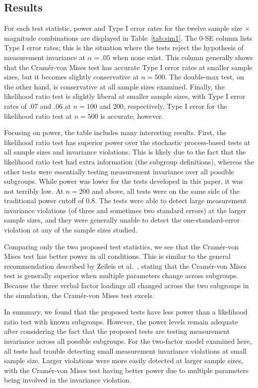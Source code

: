 \documentclass[man]{apa}
\begin{document}
\subsection{Results}
For each test statistic, power and Type I error rates for the twelve
sample size $\times$ magnitude combinations are displayed in
Table~\ref{tab:sim1}.  The 0-SE column lists Type I error rates; this
is the situation where the tests reject the hypothesis of measurement
invariance at $\alpha=.05$ when none exist.  This column generally
shows that the Cram\'{e}r-von Mises test has accurate Type I error
rates at smaller sample sizes, but it becomes slightly conservative at
$n=500$.  The double-max test, on the other hand, is conservative at
all sample sizes examined.  Finally, the likelihood ratio test is
slightly liberal at smaller sample sizes, with Type I error rates of
.07 and .06 at $n=100$ and $200$, respectively.  Type I error for the
likelihood ratio test at $n=500$ is accurate, however.

Focusing on power, the table includes many interesting results.
First, the likelihood ratio test has superior power over the stochastic
process-based tests at all sample sizes and invariance violations.
This is likely due to the fact that the likelihood ratio test had
extra information (the subgroup definitions), whereas the other tests
were essentially testing measurement invariance over all possible
subgroups.  While power was lower for the tests developed in this
paper, it was not terribly low.  At $n=200$ and above, all tests were
on the same side of the traditional power cutoff of 0.8.  The tests
were able to detect large measurement invariance violations (of three
and sometimes two standard errors) at the larger sample sizes, and
they were generally unable to detect the one-standard-error violation
at any of the sample sizes studied.

Comparing only the two proposed test statistics, we see that the
Cram\'{e}r-von Mises test has better power in all conditions.  This is
similar to the general recommendation described by Zeileis et al.\
\citeyear{ZeiSha10}, stating that the Cram\'{e}r-von Mises test
is generally superior when multiple parameters change across
subgroups.  Because the three verbal factor loadings all changed
across the two subgroups in the simulation, the Cram\'{e}r-von Mises
test excels.

In summary, we found that the proposed tests have less power than a
likelihood ratio test with known subgroups.  However, the power levels
remain adequate after considering the fact that the proposed tests are
testing measurement invariance across all possible subgroups.  For the
two-factor model examined here, all tests had trouble detecting small
measurement invariance violations at small sample size.  Larger
violations were more easily detected at larger sample sizes, with the
Cram\'{e}r-von Mises test having better power due to multiple
parameters being involved in the invariance violation.
\end{document}
